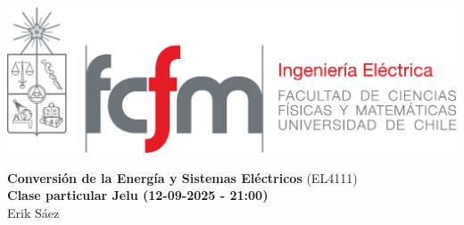 \documentclass[
  11pt,
  letterpaper,
   addpoints,
  ]{exam}
\begin{document}
\noindent
\begin{minipage}{0.47\textwidth}
\includegraphics[width=\textwidth]{../fcfm_die}
\end{minipage}
\begin{minipage}{0.53\textwidth}
\begin{center} 
\large\textbf{Conversión de la Energía y Sistemas Eléctricos} (EL4111) \\
\large\textbf{Clase particular Jelu (12-09-2025 - 21:00)} \\
\small Erik Sáez\\
\end{center}
\end{minipage}

\vspace{0.5cm}
\noindent
\vspace{.85cm}
\end{document}
